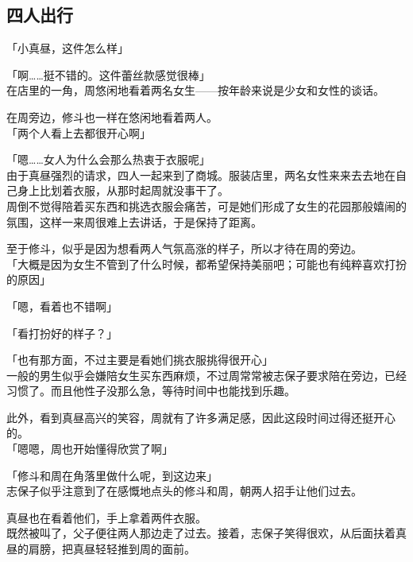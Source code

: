 \subsection{四人出行}

「小真昼，这件怎么样」

「啊……挺不错的。这件蕾丝款感觉很棒」\\

在店里的一角，周悠闲地看着两名女生——按年龄来说是少女和女性的谈话。

在周旁边，修斗也一样在悠闲地看着两人。\\

「两个人看上去都很开心啊」

「嗯……女人为什么会那么热衷于衣服呢」\\

由于真昼强烈的请求，四人一起来到了商城。服装店里，两名女性来来去去地在自己身上比划着衣服，从那时起周就没事干了。\\

周倒不觉得陪着买东西和挑选衣服会痛苦，可是她们形成了女生的花园那般嬉闹的氛围，这样一来周很难上去讲话，于是保持了距离。

至于修斗，似乎是因为想看两人气氛高涨的样子，所以才待在周的旁边。\\

「大概是因为女生不管到了什么时候，都希望保持美丽吧；可能也有纯粹喜欢打扮的原因」

「嗯，看着也不错啊」

「看打扮好的样子？」

「也有那方面，不过主要是看她们挑衣服挑得很开心」\\

一般的男生似乎会嫌陪女生买东西麻烦，不过周常常被志保子要求陪在旁边，已经习惯了。而且他性子没那么急，等待时间中也能找到乐趣。

此外，看到真昼高兴的笑容，周就有了许多满足感，因此这段时间过得还挺开心的。\\

「嗯嗯，周也开始懂得欣赏了啊」

「修斗和周在角落里做什么呢，到这边来」\\

志保子似乎注意到了在感慨地点头的修斗和周，朝两人招手让他们过去。

真昼也在看着他们，手上拿着两件衣服。\\

既然被叫了，父子便往两人那边走了过去。接着，志保子笑得很欢，从后面扶着真昼的肩膀，把真昼轻轻推到周的面前。\\

